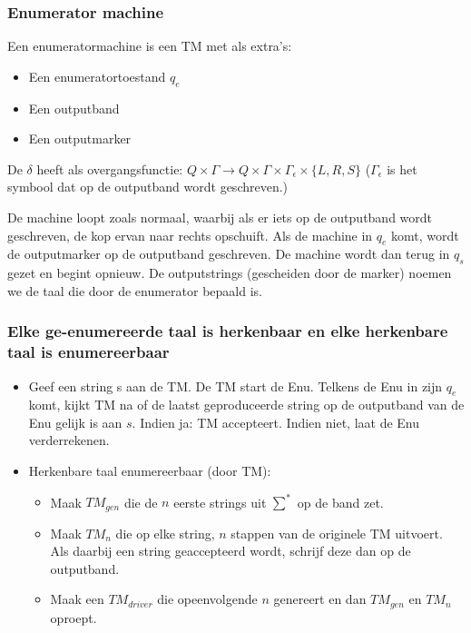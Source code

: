 \documentclass{article}
\begin{document}
        \subsubsection{Enumerator machine}
            Een enumeratormachine is een TM met als extra's:
            \begin{itemize}
                \item Een enumeratortoestand $q_e$
                \item Een outputband
                \item Een outputmarker
            \end{itemize}
            De $\delta$ heeft als overgangsfunctie: $Q \times \Gamma \rightarrow Q \times \Gamma \times \Gamma_\epsilon \times \{L,R,S\}$ ($\Gamma_\epsilon$ is het symbool dat op de outputband wordt geschreven.)

            De machine loopt zoals normaal, waarbij als er iets op de outputband wordt geschreven, de kop ervan naar rechts opschuift. Als de machine in $q_e$ komt, wordt de outputmarker op de outputband geschreven. De machine wordt dan terug in $q_s$ gezet en begint opnieuw. De outputstrings (gescheiden door de marker) noemen we de taal die door de enumerator bepaald is.

        \subsubsection{Elke ge-enumereerde taal is herkenbaar en elke herkenbare taal is enumereerbaar}
            \begin{itemize}
                \item Geef een string s aan de TM. De TM start de Enu. Telkens de Enu in zijn $q_e$ komt, kijkt TM na of de laatst geproduceerde string op de outputband van de Enu gelijk is aan $s$. Indien ja: TM accepteert. Indien niet, laat de Enu verderrekenen.
                \item Herkenbare taal enumereerbaar (door TM):
                \begin{itemize}
                    \item Maak $TM_{gen}$ die de $n$ eerste strings uit $\sum^*$ op de band zet.
                    \item Maak $TM_{n}$ die op elke string, $n$ stappen van de originele TM uitvoert. Als daarbij een string geaccepteerd wordt, schrijf deze dan op de outputband.
                    \item Maak een $TM_{driver}$ die opeenvolgende $n$ genereert en dan $TM_{gen}$ en $TM_n$ oproept.                
                \end{itemize}
            \end{itemize}
\end{document}
